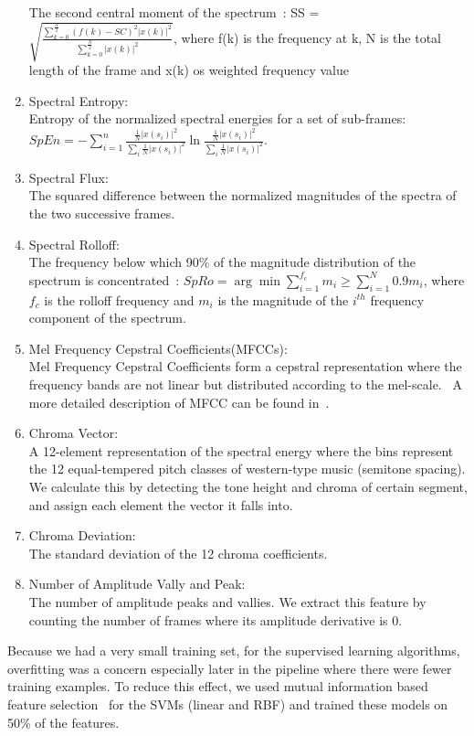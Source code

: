 \begin{enumerate}
	The second central moment of the spectrum~\cite{b3}:  SS = $\sqrt{\frac{\sum_{k = 0}^{\frac{N}{2}} (f(k)-SC)^2 |x(k)|^2}{\sum_{k = 0}^{\frac{N}{2}} |x(k)|^2 }}$, where f(k) is the frequency at k, N is the total length of the frame and x(k) os weighted frequency value \\
	\item Spectral Entropy:\\
	Entropy of the normalized spectral energies for a set of sub-frames\cite{b3}: $SpEn = -\sum_{i = 1}^{n} \frac{\frac{1}{N} |x(s_i)|^2}{\sum_{i}^{}\frac{1}{N} |x(s_i)|^2} \ln\frac{\frac{1}{N} |x(s_i)|^2}{\sum_{i}^{}\frac{1}{N} |x(s_i)|^2}$.
	\item Spectral Flux:\\
	The squared difference between the normalized magnitudes of the spectra of the two successive frames.~\cite{b3} 
	\item Spectral Rolloff:\\
	The frequency below which 90\% of the magnitude distribution of the spectrum is concentrated~\cite{b3}: $SpRo = \arg \min \sum_{i = 1}^{f_c} m_i \geq \sum_{i = 1}^{N}0.9 m_i$, where $f_c$ is the rolloff frequency and $m_i$ is the magnitude of the $i^{th}$ frequency component of the spectrum. 
	\item Mel Frequency Cepstral Coefficients(MFCCs):\\
	Mel Frequency Cepstral Coefficients form a cepstral representation where the frequency bands are not linear but distributed according to the mel-scale.~\cite{b4} A more detailed description of MFCC can be found in~\cite{b9}.
	\item Chroma Vector:\\
	A 12-element representation of the spectral energy where the bins represent the 12 equal-tempered pitch classes of western-type music (semitone spacing).\cite{b5} We calculate this by detecting the tone height and chroma of certain segment, and assign each element the vector it falls into.
	\item Chroma Deviation:\\
	The standard deviation of the 12 chroma coefficients.~\cite{b5}
	\item Number of Amplitude Vally and Peak:\\
	The number of amplitude peaks and vallies. We extract this feature by counting the number of frames where its amplitude derivative is 0. %
\end{enumerate}
Because we had a very small training set, for the supervised learning algorithms, overfitting was a concern especially later in the pipeline where there were fewer training examples. To reduce this effect, we used mutual information based feature selection~\cite{b25} for the SVMs (linear and RBF) and trained these models on 50\% of the features.

